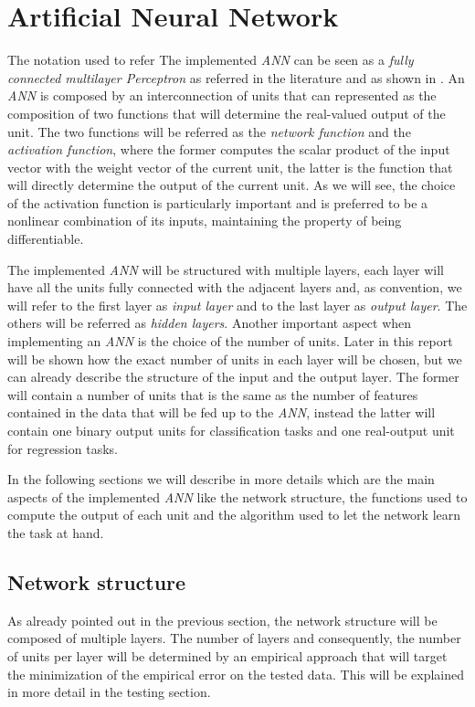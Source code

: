 \section{Artificial Neural Network}
The notation used to refer The implemented \textit{ANN} can be seen as a \textit{fully connected multilayer Perceptron} as referred in the literature and as shown in \cite{MLmitchell}. An \textit{ANN} is composed by an interconnection of units that can represented as the composition of two functions that will determine the real-valued output of the unit. The two functions will be referred as the \textit{network function} and the \textit{activation function}, where the former computes the scalar product of the input vector with the weight vector of the current unit, the latter is the function that will directly determine the output of the current unit. As we will see, the choice of the activation function is particularly important and is preferred to be a nonlinear combination of its inputs, maintaining the property of being differentiable.

The implemented \textit{ANN} will be structured with multiple layers, each layer will have all the units fully connected with the adjacent layers and, as convention, we will refer to the first layer as \textit{input layer} and to the last layer as \textit{output layer}. The others will be referred as \textit{hidden layers}. Another important aspect when implementing an \textit{ANN} is the choice of the number of units. Later in this report will be shown how the exact number of units in each layer will be chosen, but we can already describe the structure of the input and the output layer. The former will contain a number of units that is the same as the number of features contained in the data that will be fed up to the \textit{ANN}, instead the latter will contain one binary output units for classification tasks and one real-output unit for regression tasks.\newline

In the following sections we will describe in more details which are the main aspects of the implemented \textit{ANN} like the network structure, the functions used to compute the output of each unit and the algorithm used to let the network learn the task at hand.

\subsection{Network structure}
As already pointed out in the previous section, the network structure will be composed of multiple layers. The number of layers and consequently, the number of units per layer will be determined by an empirical approach that will target the minimization of the empirical error on the tested data. This will be explained in more detail in the testing section.\newline

